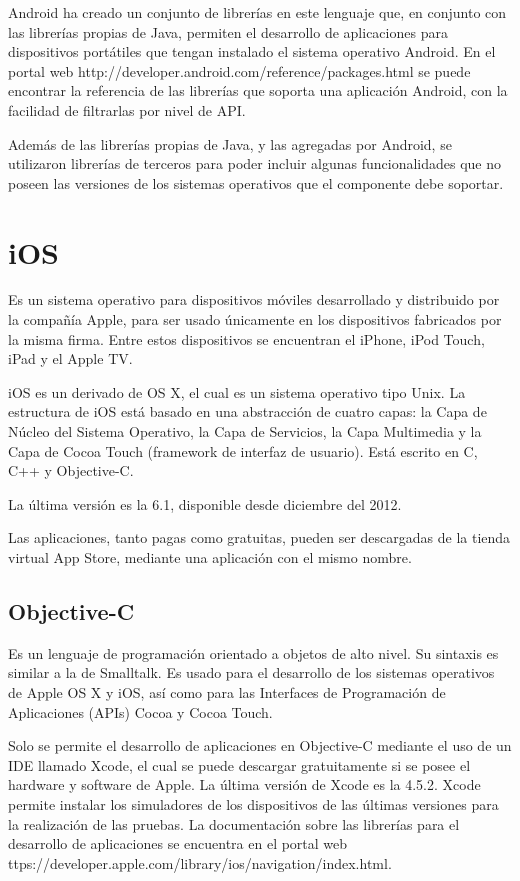 Android ha creado un conjunto de librerías en este lenguaje que, en
conjunto con las librerías propias de Java, permiten el desarrollo
de aplicaciones para dispositivos portátiles que tengan instalado
el sistema operativo Android. En el portal web http://developer.android.com/reference/packages.html
se puede encontrar la referencia de las librerías que soporta una
aplicación Android, con la facilidad de filtrarlas por nivel de API.

Además de las librerías propias de Java, y las agregadas por Android,
se utilizaron librerías de terceros para poder incluir algunas funcionalidades
que no poseen las versiones de los sistemas operativos que el componente
debe soportar.


\section{iOS}

Es un sistema operativo para dispositivos móviles desarrollado y distribuido
por la compañía Apple, para ser usado únicamente en los dispositivos
fabricados por la misma firma. Entre estos dispositivos se encuentran
el iPhone, iPod Touch, iPad y el Apple TV. 

iOS es un derivado de OS X, el cual es un sistema operativo tipo Unix.
La estructura de iOS está basado en una abstracción de cuatro capas:
la Capa de Núcleo del Sistema Operativo, la Capa de Servicios, la
Capa Multimedia y la Capa de Cocoa Touch (framework de interfaz de
usuario). Está escrito en C, C++ y Objective-C. 

La última versión es la 6.1, disponible desde diciembre del 2012.

Las aplicaciones, tanto pagas como gratuitas, pueden ser descargadas
de la tienda virtual App Store, mediante una aplicación con el mismo
nombre.


\subsection{Objective-C}

Es un lenguaje de programación orientado a objetos de alto nivel.
Su sintaxis es similar a la de Smalltalk. Es usado para el desarrollo
de los sistemas operativos de Apple OS X y iOS, así como para las
Interfaces de Programación de Aplicaciones (APIs) Cocoa y Cocoa Touch.

Solo se permite el desarrollo de aplicaciones en Objective-C mediante
el uso de un IDE llamado Xcode, el cual se puede descargar gratuitamente
si se posee el hardware y software de Apple. La última versión de
Xcode es la 4.5.2. Xcode permite instalar los simuladores de los dispositivos
de las últimas versiones para la realización de las pruebas. La documentación
sobre las librerías para el desarrollo de aplicaciones se encuentra
en el portal web ttps://developer.apple.com/library/ios/navigation/index.html. 


